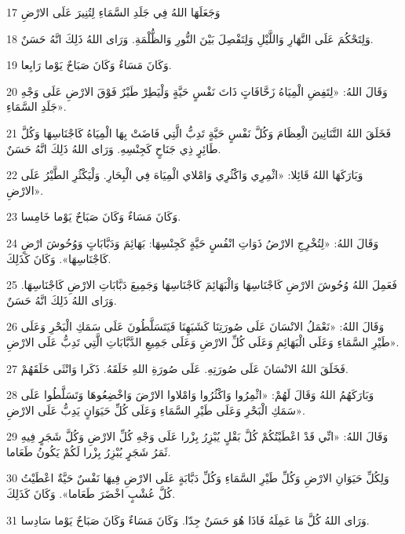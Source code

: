 \par 17 وَجَعَلَهَا اللهُ فِي جَلَدِ السَّمَاءِ لِتُنِيرَ عَلَى الارْضِ
\par 18 وَلِتَحْكُمَ عَلَى النَّهَارِ وَاللَّيْلِ وَلِتَفْصِلَ بَيْنَ النُّورِ وَالظُّلْمَةِ. وَرَاى اللهُ ذَلِكَ انَّهُ حَسَنٌ.
\par 19 وَكَانَ مَسَاءٌ وَكَانَ صَبَاحٌ يَوْما رَابِعا.
\par 20 وَقَالَ اللهُ: «لِتَفِضِ الْمِيَاهُ زَحَّافَاتٍ ذَاتَ نَفْسٍ حَيَّةٍ وَلْيَطِرْ طَيْرٌ فَوْقَ الارْضِ عَلَى وَجْهِ جَلَدِ السَّمَاءِ».
\par 21 فَخَلَقَ اللهُ التَّنَانِينَ الْعِظَامَ وَكُلَّ نَفْسٍ حَيَّةٍ تَدِبُّ الَّتِي فَاضَتْ بِهَا الْمِيَاهُ كَاجْنَاسِهَا وَكُلَّ طَائِرٍ ذِي جَنَاحٍ كَجِنْسِهِ. وَرَاى اللهُ ذَلِكَ انَّهُ حَسَنٌ.
\par 22 وَبَارَكَهَا اللهُ قَائِلا: «اثْمِرِي وَاكْثُرِي وَامْلاي الْمِيَاهَ فِي الْبِحَارِ. وَلْيَكْثُرِ الطَّيْرُ عَلَى الارْضِ».
\par 23 وَكَانَ مَسَاءٌ وَكَانَ صَبَاحٌ يَوْما خَامِسا.
\par 24 وَقَالَ اللهُ: «لِتُخْرِجِ الارْضُ ذَوَاتِ انْفُسٍ حَيَّةٍ كَجِنْسِهَا: بَهَائِمَ وَدَبَّابَاتٍ وَوُحُوشَ ارْضٍ كَاجْنَاسِهَا». وَكَانَ كَذَلِكَ.
\par 25 فَعَمِلَ اللهُ وُحُوشَ الارْضِ كَاجْنَاسِهَا وَالْبَهَائِمَ كَاجْنَاسِهَا وَجَمِيعَ دَبَّابَاتِ الارْضِ كَاجْنَاسِهَا. وَرَاى اللهُ ذَلِكَ انَّهُ حَسَنٌ.
\par 26 وَقَالَ اللهُ: «نَعْمَلُ الانْسَانَ عَلَى صُورَتِنَا كَشَبَهِنَا فَيَتَسَلَّطُونَ عَلَى سَمَكِ الْبَحْرِ وَعَلَى طَيْرِ السَّمَاءِ وَعَلَى الْبَهَائِمِ وَعَلَى كُلِّ الارْضِ وَعَلَى جَمِيعِ الدَّبَّابَاتِ الَّتِي تَدِبُّ عَلَى الارْضِ».
\par 27 فَخَلَقَ اللهُ الانْسَانَ عَلَى صُورَتِهِ. عَلَى صُورَةِ اللهِ خَلَقَهُ. ذَكَرا وَانْثَى خَلَقَهُمْ.
\par 28 وَبَارَكَهُمُ اللهُ وَقَالَ لَهُمْ: «اثْمِرُوا وَاكْثُرُوا وَامْلاوا الارْضَ وَاخْضِعُوهَا وَتَسَلَّطُوا عَلَى سَمَكِ الْبَحْرِ وَعَلَى طَيْرِ السَّمَاءِ وَعَلَى كُلِّ حَيَوَانٍ يَدِبُّ عَلَى الارْضِ».
\par 29 وَقَالَ اللهُ: «انِّي قَدْ اعْطَيْتُكُمْ كُلَّ بَقْلٍ يُبْزِرُ بِزْرا عَلَى وَجْهِ كُلِّ الارْضِ وَكُلَّ شَجَرٍ فِيهِ ثَمَرُ شَجَرٍ يُبْزِرُ بِزْرا لَكُمْ يَكُونُ طَعَاما.
\par 30 وَلِكُلِّ حَيَوَانِ الارْضِ وَكُلِّ طَيْرِ السَّمَاءِ وَكُلِّ دَبَّابَةٍ عَلَى الارْضِ فِيهَا نَفْسٌ حَيَّةٌ اعْطَيْتُ كُلَّ عُشْبٍ اخْضَرَ طَعَاما». وَكَانَ كَذَلِكَ.
\par 31 وَرَاى اللهُ كُلَّ مَا عَمِلَهُ فَاذَا هُوَ حَسَنٌ جِدّا. وَكَانَ مَسَاءٌ وَكَانَ صَبَاحٌ يَوْما سَادِسا.

